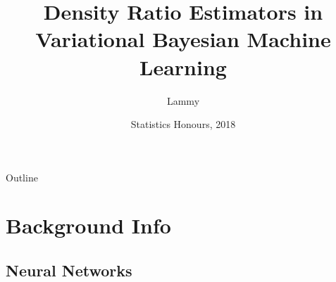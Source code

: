\documentclass{beamer}
\title{Density Ratio Estimators in Variational Bayesian Machine Learning}
\author{Lammy}
\institute[UNSW] %
{
  Department of Mathematics and Statistics\\
  UNSW
  }
\date{Statistics Honours, 2018}
\begin{document}
\begin{frame}
  \titlepage
\end{frame}

\begin{frame}{Outline}
  \tableofcontents
\end{frame}

\section{Background Info}

\subsection{Neural Networks}
\end{document}

